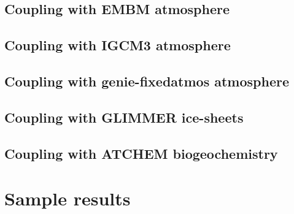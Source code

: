 \documentclass[a4paper]{article}
\begin{document}
\subsection{Coupling with EMBM atmosphere}\label{s:coup.embm}
\subsection{Coupling with IGCM3 atmosphere}\label{s:coup.igcm}
\subsection{Coupling with genie-fixedatmos atmosphere}\label{s:coup.fixatm}
\subsection{Coupling with GLIMMER ice-sheets}\label{s:coup.glim}
\subsection{Coupling with ATCHEM biogeochemistry}\label{s:coup.chem}

\section{Sample results}\label{s:result}

\renewcommand{\bibname}{References}


\end{document}
